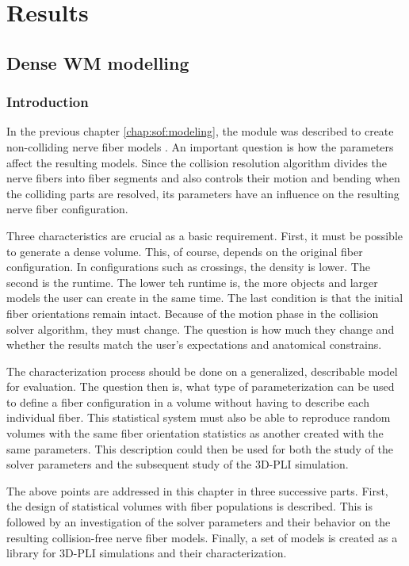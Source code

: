 \cleardoublepage
\part{Results}
\parttoc
% 
% 
% 
\setcounter{chapter}{6}
\chapter{Dense \acs{WM} modelling}
\label{cha:model_analysis}
%
% 
\section{Introduction}
%
In the previous chapter \cref{chap:sof:modeling}, the module  was described to create non-colliding nerve fiber models \cite{Matuschke2019, Matuschke2021}.
An important question is how the parameters affect the resulting models.
Since the collision resolution algorithm divides the nerve fibers into fiber segments and also controls their motion and bending when the colliding parts are resolved, its parameters have an influence on the resulting nerve fiber configuration.
\par
%
Three characteristics are crucial as a basic requirement.
First, it must be possible to generate a dense volume.
This, of course, depends on the original fiber configuration.
In configurations  such as crossings, the density is lower.
The second is the runtime.
The lower teh runtime is, the more objects and larger models the user can create in the same time.
The last condition is that the initial fiber orientations remain intact.
Because of the motion phase in the collision solver algorithm, they must change.
The question is how much they change and whether the results match the user's expectations and anatomical constrains.
\par
%
The characterization process should be done on a generalized, describable model for evaluation.
The question then is, what type of parameterization can be used to define a fiber configuration in a volume without having to describe each individual fiber.
This statistical system must also be able to reproduce random volumes with the same fiber orientation statistics as another created with the same parameters.
This description could then be used for both the study of the solver parameters and the subsequent study of the \ac{3D-PLI} simulation.
\par
%
The above points are addressed in this chapter in three successive parts.
First, the design of statistical volumes with fiber populations is described.
This is followed by an investigation of the solver parameters and their behavior on the resulting collision-free nerve fiber models.
Finally, a set of models is created as a library for \ac{3D-PLI} simulations and their characterization.
%
%
%

